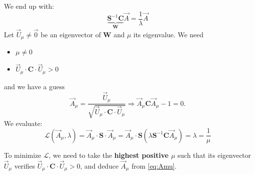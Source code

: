 \documentclass[aps,12pt]{revtex4}
\begin{document}
We end up with:
\begin{equation}
	\underbrace{\bm{S}^{-1} \bm{C}}_{\bm{W}} \vec{A} = \dfrac{1}{\lambda} \vec{A}
\end{equation}
Let $\vec{U}_\mu\not=\vec{0}$ be an eigenvector of $\bm{W}$ and $\mu$ its eigenvalue.
We need
\begin{itemize}
\item $\mu\not=0$
\item $\vec{U}_\mu\cdot\bm{C}\cdot\vec{U}_\mu>0$
\end{itemize}
and we have a guess
\begin{equation}
\label{eq:Amu}
	\vec{A}_\mu = \dfrac{ \vec{U}_\mu}{\sqrt{\vec{U}_\mu\cdot\bm{C}\cdot\vec{U}_\mu}} \Rightarrow \vec{A}_\mu \bm{C} \vec{A}_\mu-1 = 0.
\end{equation}
We evaluate:
\begin{equation}
\mathcal{L}(\vec{A}_\mu,\lambda) = \vec{A}_\mu \cdot \bm{S} \cdot \vec{A}_\mu 
= \vec{A}_\mu \cdot \bm{S} \left( \lambda \bm{S}^{-1} \bm{C} \vec{A}_\mu \right) = \lambda = \dfrac{1}{\mu}
\end{equation}

To minimize $\mathcal{L}$, we need to take the \textbf{highest positive $\mu$} such that its eigenvector $\vec{U}_\mu$ verifies
 $\vec{U}_\mu\cdot\bm{C}\cdot\vec{U}_\mu>0$, and deduce $\vec{A}_\mu$ from \eqref{eq:Amu}.
\end{document}
